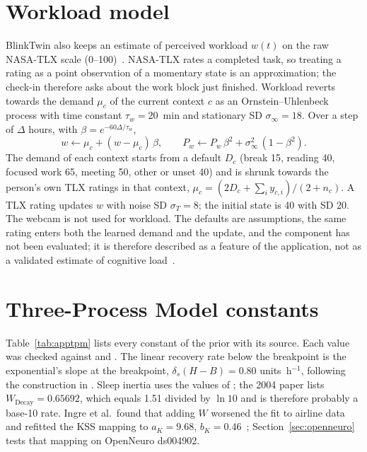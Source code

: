\appendices
\section{Workload model}
\label{app:workload}
BlinkTwin also keeps an estimate of perceived workload $w(t)$ on the raw NASA-TLX scale (0--100)~\cite{hart1988development,hart2006nasa}. NASA-TLX rates a completed task, so treating a rating as a point observation of a momentary state is an approximation; the check-in therefore asks about the work block just finished. Workload reverts towards the demand $\mu_c$ of the current context $c$ as an Ornstein--Uhlenbeck process with time constant $\tau_w = 20$~min and stationary SD $\sigma_\infty = 18$. Over a step of $\Delta$ hours, with $\beta = e^{-60\Delta/\tau_w}$,
\begin{equation}
  w \leftarrow \mu_c + (w - \mu_c)\,\beta, \qquad P_w \leftarrow P_w\,\beta^2 + \sigma_\infty^2\,(1 - \beta^2).
\end{equation}
The demand of each context starts from a default $D_c$ (break 15, reading 40, focused work 65, meeting 50, other or unset 40) and is shrunk towards the person's own TLX ratings in that context, $\mu_c = (2D_c + \sum_i y_{c,i})/(2 + n_c)$. A TLX rating updates $w$ with noise SD $\sigma_T = 8$; the initial state is 40 with SD 20. The webcam is not used for workload. The defaults are assumptions, the same rating enters both the learned demand and the update, and the component has not been evaluated; it is therefore described as a feature of the application, not as a validated estimate of cognitive load~\cite{paas2003cognitive}.

\section{Three-Process Model constants}
\label{app:tpm}
Table~\ref{tab:apptpm} lists every constant of the prior with its source. Each value was checked against \cite{akerstedt2004predictions} and \cite{ingre2014validating}. The linear recovery rate below the breakpoint is the exponential's slope at the breakpoint, $\delta_s(H - B) = 0.80$ units~h$^{-1}$, following the construction in \cite{akerstedt2004predictions}. Sleep inertia uses the values of \cite{ingre2014validating}; the 2004 paper lists $W_{\mathrm{Decay}} = 0.65692$, which equals 1.51 divided by $\ln 10$ and is therefore probably a base-10 rate. Ingre et al.\ found that adding $W$ worsened the fit to airline data and refitted the KSS mapping to $a_K = 9.68$, $b_K = 0.46$~\cite{ingre2014validating}; Section~\ref{sec:openneuro} tests that mapping on OpenNeuro ds004902.

